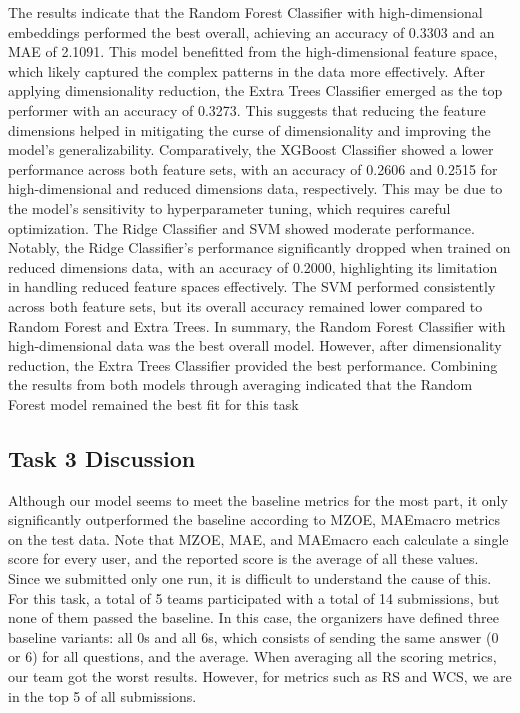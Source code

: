 \documentclass[]{style/ceurart}
\begin{document}
The results indicate that the Random Forest Classifier with high-dimensional embeddings performed the best overall, achieving an accuracy of 0.3303 and an MAE of 2.1091. This model benefitted from the high-dimensional feature space, which likely captured the complex patterns in the data more effectively.
After applying dimensionality reduction, the Extra Trees Classifier emerged as the top performer with an accuracy of 0.3273. This suggests that reducing the feature dimensions helped in mitigating the curse of dimensionality and improving the model's generalizability.
Comparatively, the XGBoost Classifier showed a lower performance across both feature sets, with an accuracy of 0.2606 and 0.2515 for high-dimensional and reduced dimensions data, respectively. This may be due to the model's sensitivity to hyperparameter tuning, which requires careful optimization.
The Ridge Classifier and SVM showed moderate performance. Notably, the Ridge Classifier's performance significantly dropped when trained on reduced dimensions data, with an accuracy of 0.2000, highlighting its limitation in handling reduced feature spaces effectively. The SVM performed consistently across both feature sets, but its overall accuracy remained lower compared to Random Forest and Extra Trees.
In summary, the Random Forest Classifier with high-dimensional data was the best overall model. However, after dimensionality reduction, the Extra Trees Classifier provided the best performance. Combining the results from both models through averaging indicated that the Random Forest model remained the best fit for this task


\subsection{Task 3 Discussion}

Although our model seems to meet the baseline metrics for the most part, it only significantly outperformed the baseline according to MZOE, MAEmacro metrics on the test data. Note that MZOE, MAE, and MAEmacro each calculate a single score for every user, and the reported score is the average of all these values. Since we submitted only one run, it is difficult to understand the cause of this. For this task, a total of 5 teams participated with a total of 14 submissions, but none of them passed the baseline. In this case, the organizers have defined three baseline variants: all 0s and all 6s, which consists of sending the same answer (0 or 6) for all questions, and the average. When averaging all the scoring metrics, our team got the worst results. However, for metrics such as RS and WCS, we are in the top 5 of all submissions.
\end{document}
